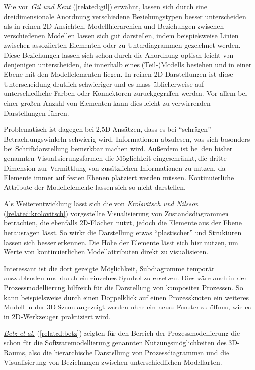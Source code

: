 \documentclass[a4paper,10pt]{sphinxmanual}
\begin{document}
Wie von {\hyperref[related:gil]{\emph{Gil und Kent}}} (\autoref*{related:gil}) erwähnt, lassen sich durch eine dreidimensionale Anordnung verschiedene Beziehungstypen besser unterscheiden als in reinen 2D-Ansichten.
Modellhierarchien und Beziehungen zwischen verschiedenen Modellen lassen sich gut darstellen, indem beispielsweise Linien zwischen assoziierten Elementen oder zu Unterdiagrammen gezeichnet werden.
Diese Beziehungen lassen sich schon durch die Anordnung optisch leicht von denjenigen unterscheiden, die innerhalb eines (Teil-)Modells bestehen und in einer Ebene mit den Modellelementen liegen.
In reinen 2D-Darstellungen ist diese Unterscheidung deutlich schwieriger und es muss üblicherweise auf unterschiedliche Farben oder Konnektoren zurückgegriffen werden.
Vor allem bei einer großen Anzahl von Elementen kann dies leicht zu verwirrenden Darstellungen führen.

Problematisch ist dagegen bei 2,5D-Ansätzen, dass es bei "`schrägen"' Betrachtungswinkeln schwierig wird, Informationen abzulesen, was sich besonders bei Schriftdarstellung bemerkbar machen wird.
Außerdem ist bei den bisher genannten Visualisierungsformen die Möglichkeit eingeschränkt, die dritte Dimension zur Vermittlung von zusätzlichen Informationen zu nutzen, da Elemente immer auf festen Ebenen platziert werden müssen.
Kontinuierliche Attribute der Modellelemente lassen sich so nicht darstellen.

Als Weiterentwicklung lässt sich die von {\hyperref[related:krolovitsch]{\emph{Krolovitsch und Nilsson}}} (\autoref*{related:krolovitsch}) vorgestellte Visualisierung von Zustandsdiagrammen betrachten, die ebenfalls 2D-Flächen nutzt, jedoch die Elemente aus der Ebene herausragen lässt.
So wirkt die Darstellung etwas "`plastischer"' und Strukturen lassen sich besser erkennen.
Die Höhe der Elemente lässt sich hier nutzen, um Werte von kontinuierlichen Modellattributen direkt zu visualisieren.

Interessant ist die dort gezeigte Möglichkeit, Subdiagramme temporär auszublenden und durch ein einzelnes Symbol zu ersetzen.
Dies wäre auch in der Prozessmodellierung hilfreich für die Darstellung von kompositen Prozessen.
So kann beispielsweise durch einen Doppelklick auf einen Prozessknoten ein weiteres Modell in der 3D-Szene angezeigt werden ohne ein neues Fenster zu öffnen, wie es in 2D-Werkzeugen praktiziert wird.

{\hyperref[related:betz]{\emph{Betz et al.}}} (\autoref*{related:betz}) zeigten für den Bereich der Prozessmodellierung die schon für die Softwaremodellierung genannten Nutzungsmöglichkeiten des 3D-Raums, also die hierarchische Darstellung von Prozessdiagrammen und die Visualisierung von Beziehungen zwischen unterschiedlichen Modellarten.
\end{document}
